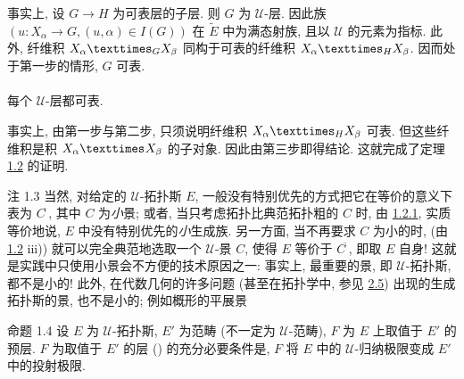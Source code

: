 事实上, 设 $G\rightarrow H$ 为可表层的子层. 则 $G$ 为 $𝒰$-层. 因此族 $(u:X_{\alpha}\rightarrow G, (u,\alpha)\in I(G))$ 在 $\widetilde{E}$ 中为满态射族, 且以 $𝒰$ 的元素为指标. 此外, 纤维积 $\fprod{X_{\alpha}}{X_{\beta}}{G}$ 同构于可表的纤维积 $\fprod{X_{\alpha}}{X_{\beta}}{H}$. 因而处于第一步的情形, $G$ 可表.

\paragraph{}
每个 $𝒰$-层都可表.

事实上, 由第一步与第二步, 只须说明纤维积 $\fprod{X_{\alpha}}{X_{\beta}}{H}$ 可表. 但这些纤维积是积 $\fprod{X_{\alpha}}{X_{\beta}}{}$ 的子对象. 因此由第三步即得结论. 这就完成了定理 \hyperref[IV.theo1.2]{1.2} 的证明.

\begin{enonce*}[remark]{注 1.3}
当然\pageoriginale, 对给定的 $𝒰$-拓扑斯 $E$, 一般没有特别优先的方式把它在等价的意义下表为 $C^{\widetilde{\phantom{,}}}$, 其中 $C$ 为\emph{小}景; 或者, 当只考虑拓扑比典范拓扑粗的 $C$ 时, 由 \hyperref[IV.cor1.2.1]{1.2.1}, 实质等价地说, $E$ 中没有特别优先的\emph{小}生成族. 另一方面, 当不再要求 $C$ 为小的时, (由 \hyperref[IV.theo1.2]{1.2} iii)) 就可以完全典范地选取一个 $𝒰$-景 $C$, 使得 $E$ 等价于 $C^{\widetilde{\phantom{,}}}$, 即取 $E$ 自身! 这就是实践中只使用小景会不方便的技术原因之一: 事实上, 最重要的景, 即 $𝒰$-拓扑斯, 都不是小的! 此外, 在代数几何的许多问题 (甚至在拓扑学中, 参见 \hyperref[IV.subsec2.5]{2.5}) 出现的生成拓扑斯的景, 也不是小的; 例如概形的平展景 
\end{enonce*}



\begin{enonce*}{命题 1.4}
设 $E$ 为 $𝒰$-拓扑斯, $E'$ 为范畴 (不一定为 $𝒰$-范畴), $F$ 为 $E$ 上取值于 $E'$ 的预层. $F$ 为取值于 $E'$ 的层 {\rm()} 的充分必要条件是, $F$ 将 $E$ 中的 $𝒰$-归纳极限变成 $E'$ 中的投射极限.
\end{enonce*}

